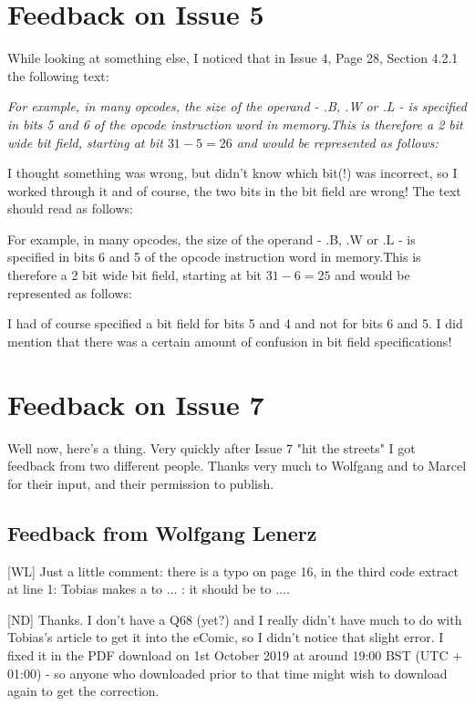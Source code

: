 \chapter{Feedback on Issue 5}

While looking at something else, I noticed that in Issue 4, Page 28, Section 4.2.1 the following text:


\emph{For example, in many opcodes, the size of the operand - .B, .W or .L - is specified in bits 5 and 6 of the opcode instruction word in memory.This is therefore a 2 bit wide bit field, starting at bit $31-5=26$ and would be represented as follows:}



I thought something was wrong, but didn't know which bit(!) was incorrect, so I worked through it and of course, the two bits in the bit field are wrong! The text should read as follows:

For example, in many opcodes, the size of the operand - .B, .W or .L - is specified in bits 6 and 5 of the opcode instruction word in memory.This is therefore a 2 bit wide bit field, starting at bit $31-6=25$ and would be represented as follows:


I had of course specified a bit field for bits 5 and 4 and not for bits 6 and 5. I did mention that there was a certain amount of confusion in bit field specifications!


\chapter{Feedback on Issue 7}

Well now, here's a thing. Very quickly after Issue 7 "hit the streets" I got feedback from two different people. Thanks very much to Wolfgang and to Marcel for their input, and their permission to publish.


\section{Feedback from Wolfgang Lenerz}

[WL] Just a little comment: there is a typo on page 16, in the third code extract at line 1: Tobias makes a  to ... : it should be to ....

[ND] Thanks. I don't have a Q68 (yet?) and I really didn't have much to do with Tobias's article to get it into the eComic, so I didn't notice that slight error. I fixed it in the PDF download on 1st October 2019 at around 19:00 BST (UTC + 01:00) - so anyone who downloaded prior to that time might wish to download again to get the correction.


